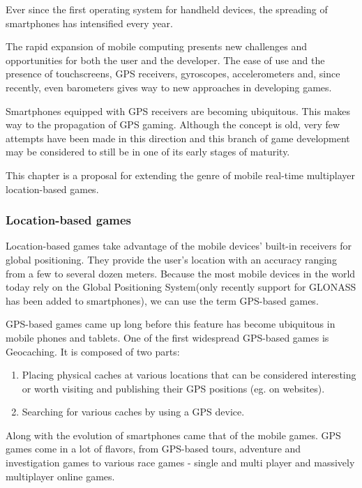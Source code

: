 \documentclass{article}
\begin{document}
Ever since the first operating system for handheld devices, the spreading of
smartphones has intensified every year.\newline

The rapid expansion of mobile computing presents new challenges and
opportunities for both the user and the developer. The ease of use and the
presence of touchscreens, GPS receivers, gyroscopes, accelerometers and, since
recently, even barometers gives way to new approaches in developing
games.\newline

Smartphones equipped with GPS receivers are becoming ubiquitous. This makes way
to the propagation of GPS gaming. Although the concept is old, very few attempts
have been made in this direction and this branch of game development may be
considered to still be in one of its early stages of maturity.\newline

This chapter is a proposal for extending the genre of mobile real-time
multiplayer location-based games.

\subsubsection{Location-based games}
Location-based games take advantage of the mobile devices' built-in receivers
for global positioning. They provide the user's location with an accuracy
ranging from a few to several dozen meters. Because the most mobile devices in
the world today rely on the Global Positioning System(only recently support for
GLONASS has been added to smartphones), we can use the term GPS-based
games.\newline

GPS-based games came up long before this feature has become ubiquitous in mobile
phones and tablets. One of the first widespread GPS-based games is Geocaching.
It is composed of two parts: 
\begin{enumerate}
  \item Placing physical caches at various locations that can be considered
  interesting or worth visiting and publishing their GPS positions (eg. on
  websites).
  \item Searching for various caches by using a GPS device.
\end{enumerate}

Along with the evolution of smartphones came that of the mobile games. GPS games
come in a lot of flavors, from GPS-based tours, adventure and investigation
games to various race games - single and multi player and massively multiplayer
online games.
\end{document}
